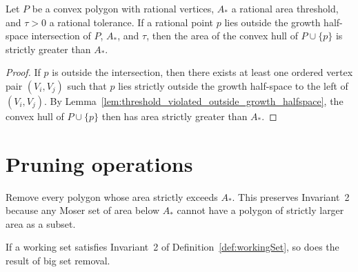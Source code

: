 \begin{lemma}
  \label{lem:threshold_violated_outside_growth_intersection}
  Let $P$ be a convex polygon with rational vertices, $A_*$ a rational
  area threshold, and $\tau > 0$ a rational tolerance. If a rational
  point $p$ lies outside the growth half-space intersection of $P$,
  $A_*$, and $\tau$, then the area of the convex hull of
  $P \cup \{p\}$ is strictly greater than $A_*$.
\end{lemma}
\begin{proof}
  If $p$ is outside the intersection, then there exists at least one
  ordered vertex pair $(V_i, V_j)$ such that $p$ lies strictly outside
  the growth half-space to the left of $(V_i, V_j)$. By
  Lemma~\ref{lem:threshold_violated_outside_growth_halfspace}, the
  convex hull of $P \cup \{p\}$ then has area strictly greater than
  $A_*$.
\end{proof}



\section{Pruning operations}

\begin{definition}
  \label{def:bigSetRemoval}
  \leanok
  Remove every polygon whose area strictly exceeds $A_*$. This preserves
  Invariant~2 because any Moser set of area below $A_*$ cannot have a
  polygon of strictly larger area as a subset.
\end{definition}

\begin{proposition}
  \label{prop:bigSetRemoval-correct}
  \leanok
  If a working set satisfies Invariant~2 of
  Definition~\ref{def:workingSet}, so does the result of big set removal.
\end{proposition}


